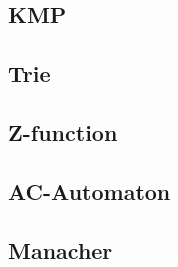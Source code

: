 \subsection{KMP}
\raggedbottom
\subsection{Trie}
\raggedbottom
\subsection{Z-function}
\raggedbottom
\subsection{AC-Automaton}
\raggedbottom
\subsection{Manacher}
\raggedbottom
\hrulefill
\pagebreak
